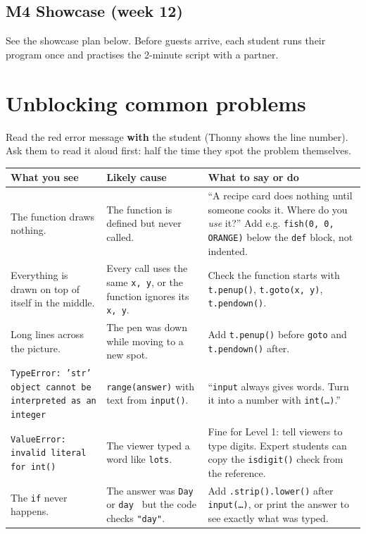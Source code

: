 \documentclass[level=1,teacher]{kidscode}
\begin{document}
\subsection{M4 Showcase (week 12)}
See the showcase plan below. Before guests arrive, each student runs their program once and practises
the 2-minute script with a partner.

\section{Unblocking common problems}
Read the red error message \textbf{with} the student (Thonny shows the line number). Ask them to read
it aloud first: half the time they spot the problem themselves.

{\small\renewcommand{\arraystretch}{1.3}
\begin{longtable}{@{}>{\RaggedRight}p{4.1cm}>{\RaggedRight}p{4.4cm}>{\RaggedRight\arraybackslash}p{\dimexpr\linewidth-8.5cm-4\tabcolsep}@{}}
\toprule
What you see & Likely cause & What to say or do\\
\midrule\endhead
\bottomrule\endfoot
The function draws nothing. & The function is defined but never called. & \enquote{A recipe card does nothing until someone cooks it. Where do you \emph{use} it?} Add e.g. \texttt{fish(0, 0, ORANGE)} below the \texttt{def} block, not indented.\\
\midrule
Everything is drawn on top of itself in the middle. & Every call uses the same \texttt{x, y}, or the function ignores its \texttt{x, y}. & Check the function starts with \texttt{t.penup()}, \texttt{t.goto(x, y)}, \texttt{t.pendown()}.\\
\midrule
Long lines across the picture. & The pen was down while moving to a new spot. & Add \texttt{t.penup()} before \texttt{goto} and \texttt{t.pendown()} after.\\
\midrule
\texttt{TypeError: 'str' object cannot be interpreted as an integer} & \texttt{range(answer)} with text from \texttt{input()}. & \enquote{\texttt{input} always gives words. Turn it into a number with \texttt{int(\dots)}.}\\
\midrule
\texttt{ValueError: invalid literal for int()} & The viewer typed a word like \texttt{lots}. & Fine for Level 1: tell viewers to type digits. Expert students can copy the \texttt{isdigit()} check from the reference.\\
\midrule
The \texttt{if} never happens. & The answer was \texttt{Day} or \texttt{day } but the code checks \texttt{"day"}. & Add \texttt{.strip().lower()} after \texttt{input(\dots)}, or print the answer to see exactly what was typed.\\

\end{longtable}}
\end{document}
